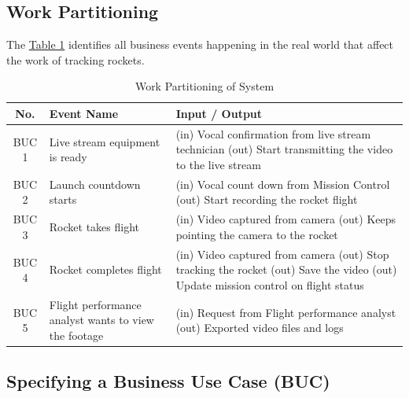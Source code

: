\documentclass[12pt]{article}
\begin{document}
\subsection{Work Partitioning}

The \hyperref[tab:work-part]{Table 1} identifies all business events happening
in the real world that affect the work of tracking rockets.

\begin{table}[H]
  \centering
  \setlength\extrarowheight{5mm}
  \begin{tabularx}{\textwidth}{cp{1.5in}X}
    \toprule \textbf{No.} & \textbf{Event Name}                                  &
    \textbf{Input / Output}                                                        \\
    \midrule
    BUC 1                 & Live stream equipment is ready                       &
    (in) Vocal confirmation from live stream technician \newline
    (out) Start transmitting the video to the live stream
    \\
    BUC 2                 & Launch countdown starts                              &
    (in) Vocal count down from Mission Control \newline
    (out) Start recording the rocket flight
    \\
    BUC 3                 & Rocket takes flight                                  &
    (in) Video captured from camera \newline
    (out) Keeps pointing the camera to the rocket
    \\
    BUC 4                 & Rocket completes flight                              &
    (in) Video captured from camera \newline
    (out) Stop tracking the rocket \newline
    (out) Save the video  \newline
    (out) Update mission control on flight status
    \\
    BUC 5                 & Flight performance analyst wants to view the footage &
    (in) Request from Flight performance analyst \newline
    (out) Exported video files and logs
    \\
    \bottomrule
  \end{tabularx}
  \caption{Work Partitioning of System}
  \label{tab:work-part}
\end{table}

\subsection{Specifying a Business Use Case (BUC)}
\end{document}
